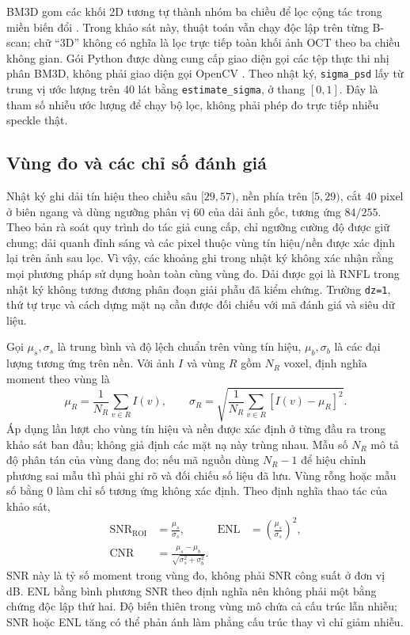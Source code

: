 BM3D gom các khối 2D tương tự thành nhóm ba chiều để lọc cộng tác trong
miền biến đổi \cite{dabov2007bm3d}. Trong khảo sát này, thuật toán vẫn chạy
độc lập trên từng B-scan; chữ ``3D'' không có nghĩa là lọc trực tiếp toàn
khối ảnh OCT theo ba chiều không gian. Gói Python được dùng cung cấp giao diện gọi
các tệp thực thi nhị phân BM3D, không phải giao diện gọi OpenCV \cite{bm3dSoftware}.
Theo nhật ký, \texttt{sigma\_psd} lấy từ trung vị ước lượng trên 40 lát
bằng \texttt{estimate\_sigma}, ở thang $[0,1]$. Đây là tham số nhiễu
ước lượng để chạy bộ lọc, không phải phép đo trực tiếp nhiễu speckle thật.

\subsection{Vùng đo và các chỉ số đánh giá}
\label{sec:denoise-metric-definitions}
Nhật ký ghi dải tín hiệu theo chiều sâu $[29,57)$, nền phía trên
$[5,29)$, cắt 40 pixel ở biên ngang và dùng ngưỡng phân vị 60 của dải
ảnh gốc, tương ứng $84/255$. Theo bản rà soát quy trình do tác giả
cung cấp, chỉ ngưỡng cường độ được giữ chung; dải quanh đỉnh sáng
và các pixel thuộc vùng tín hiệu/nền được xác định lại trên ảnh sau
lọc. Vì vậy, các khoảng ghi trong nhật ký không xác nhận rằng mọi
phương pháp sử dụng hoàn toàn cùng vùng đo. Dải được gọi là RNFL
trong nhật ký không tương đương phân đoạn giải phẫu đã kiểm chứng. Trường
\texttt{dz=1}, thứ tự trục và cách dựng mặt nạ cần được đối chiếu
với mã đánh giá và siêu dữ liệu.

Gọi $\mu_s,\sigma_s$ là trung bình và độ lệch chuẩn trên vùng tín hiệu,
$\mu_b,\sigma_b$ là các đại lượng tương ứng trên nền. Với ảnh $I$ và vùng
$R$ gồm $N_R$ voxel, định nghĩa moment theo vùng là
\begin{equation}
 \mu_R=\frac1{N_R}\sum_{v\in R}I(v),\qquad
 \sigma_R=\sqrt{\frac1{N_R}\sum_{v\in R}[I(v)-\mu_R]^2}.
 \label{eq:denoise-roi-moments}
\end{equation}
Áp dụng lần lượt cho vùng tín hiệu và nền được xác định ở từng đầu ra
trong khảo sát ban đầu; không giả định các mặt nạ này trùng nhau.
Mẫu số $N_R$ mô tả độ phân tán của vùng đang đo; nếu mã nguồn dùng
$N_R-1$ để hiệu chỉnh phương sai mẫu thì phải ghi rõ và đối chiếu số liệu
đã lưu. Vùng rỗng hoặc mẫu số bằng 0 làm chỉ số tương ứng không xác định.
Theo định nghĩa thao tác của khảo sát,
\begin{align}
  \mathrm{SNR}_{\mathrm{ROI}}&=\frac{\mu_s}{\sigma_s},&
  \mathrm{ENL}&=\left(\frac{\mu_s}{\sigma_s}\right)^2,\\
  \mathrm{CNR}&=\frac{\mu_s-\mu_b}{\sqrt{\sigma_s^2+\sigma_b^2}}.
  \label{eq:denoise-roi-metrics}
\end{align}
SNR này là tỷ số moment trong vùng đo, không phải SNR công suất ở đơn vị
dB. ENL bằng bình phương SNR theo định nghĩa nên không phải một bằng chứng
độc lập thứ hai. Độ biến thiên trong vùng mô chứa cả cấu trúc lẫn nhiễu;
SNR hoặc ENL tăng có thể phản ánh làm phẳng cấu trúc thay vì chỉ giảm nhiễu.

